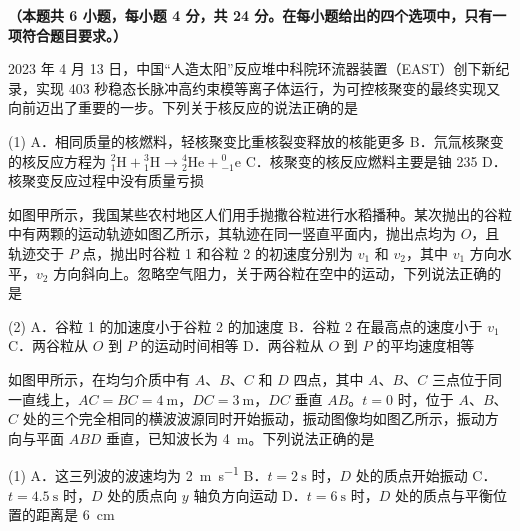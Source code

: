 

\noindent\textbf{（本题共 6 小题，每小题 4 分，共 24 分。在每小题给出的四个选项中，只有一项符合题目要求。）}

\begin{question}
2023 年 4 月 13 日，中国“人造太阳”反应堆中科院环流器装置（EAST）创下新纪录，实现 403 秒稳态长脉冲高约束模等离子体运行，为可控核聚变的最终实现又向前迈出了重要的一步。下列关于核反应的说法正确的是\gkblank

\begin{gkopts}(1)
  \task A．相同质量的核燃料，轻核聚变比重核裂变释放的核能更多
  \task B．氘氚核聚变的核反应方程为 ${}_{1}^{2}\mathrm{H}+{}_{1}^{3}\mathrm{H}\to{}_{2}^{4}\mathrm{He}+{}_{-1}^{0}\mathrm{e}$
  \task C．核聚变的核反应燃料主要是铀 235
  \task D．核聚变反应过程中没有质量亏损
\end{gkopts}
\end{question}

\begin{question}
如图甲所示，我国某些农村地区人们用手抛撒谷粒进行水稻播种。某次抛出的谷粒中有两颗的运动轨迹如图乙所示，其轨迹在同一竖直平面内，抛出点均为 $O$，且轨迹交于 $P$ 点，抛出时谷粒 1 和谷粒 2 的初速度分别为 $v_{1}$ 和 $v_{2}$，其中 $v_{1}$ 方向水平，$v_{2}$ 方向斜向上。忽略空气阻力，关于两谷粒在空中的运动，下列说法正确的是\gkblank


\begin{gkopts}(2)
  \task A．谷粒 1 的加速度小于谷粒 2 的加速度
  \task B．谷粒 2 在最高点的速度小于 $v_{1}$
  \task C．两谷粒从 $O$ 到 $P$ 的运动时间相等
  \task D．两谷粒从 $O$ 到 $P$ 的平均速度相等
\end{gkopts}
\end{question}

\begin{question}
如图甲所示，在均匀介质中有 $A$、$B$、$C$ 和 $D$ 四点，其中 $A$、$B$、$C$ 三点位于同一直线上，$AC=BC=\SI{4}{\metre}$，$DC=\SI{3}{\metre}$，$DC$ 垂直 $AB$。$t=0$ 时，位于 $A$、$B$、$C$ 处的三个完全相同的横波波源同时开始振动，振动图像均如图乙所示，振动方向与平面 $ABD$ 垂直，已知波长为 \SI{4}{\metre}。下列说法正确的是\gkblank


\begin{gkopts}(1)
  \task A．这三列波的波速均为 \SI{2}{\metre\per\second}
  \task B．$t=\SI{2}{\second}$ 时，$D$ 处的质点开始振动
  \task C．$t=\SI{4.5}{\second}$ 时，$D$ 处的质点向 $y$ 轴负方向运动
  \task D．$t=\SI{6}{\second}$ 时，$D$ 处的质点与平衡位置的距离是 \SI{6}{\centi\metre}
\end{gkopts}
\end{question}

